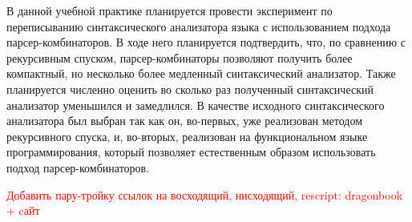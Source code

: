 В данной учебной практике планируется провести эксперимент по переписыванию синтаксического анализатора языка \ReScript{} с использованием подхода парсер-комбинаторов. В ходе него планируется подтвердить, что, по сравнению с рекурсивным спуском, парсер-комбина\-торы позволяют получить более компактный, но несколько более медленный синтаксический анализатор. Также планируется численно оценить во сколько раз полученный синтаксический анализатор уменьшился и замедлился. 
В качестве исходного синтаксического анализатора был выбран \ReScript{} так как он, во-первых, уже реализован методом рекурсивного спуска, и, во-вторых, реализован на функциональном языке программирования, который позволяет естественным образом использовать подход парсер-комбинаторов.

\textcolor{red}{Добавить пару-тройку ссылок на восходящий, нисходящий, rescript: dragonbook + cайт }



\begin{comment}
Многие синтаксические анализаторы реализованы методом рекурсивного спуска,
например, анализаторы в clang или компиляторах Kotlin или TypeScript.
Данный метод позволяет проще восстанавливаться от ошибок,
но является более объёмным и сложным в поддержке и улучшении кода.

Альтернативным методом реализации синтаксических анализаторов является метод монадических парсер-комбинаторов.
Его отличие от рекурсивного спуска --- большая декларативность,
которая приносит "читабельность" кода и легкость в изменении.

К минусам второго подхода, предположительно, можно отнести
более низкую производительность, а также сложность в восстановлении от ошибок.

Для уточнения этой гипотезы предполагается переписать синтакси\-чес\-кий анализатор ReScript,
используя подход парсер-комбинаторов, и сравнить его производительность с исходным анализатором.
\end{comment}
